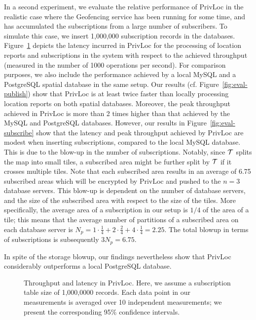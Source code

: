 \documentclass{llncs}
\newcommand\sol{{\sf PrivLoc}}
\begin{document}
In a second experiment, we evaluate the relative performance of \sol{} in the realistic case where
the Geofencing service has been running for some time, and has accumulated the subscriptions from a large number of subscribers. To simulate this case, we insert 1,000,000 subscription records in the databases.
Figure~\ref{fig:throughput} depicts the latency incurred in \sol{} for the processing of location reports and subscriptions in the system with respect to the
achieved throughput (measured in the number of 1000 operations
per second). For comparison purposes, we also include the performance achieved by a local MySQL and a PostgreSQL spatial database in the same setup.
Our results (cf. Figure~\ref{fig:eval-publish}) show that \sol{} is at least twice faster than locally processing location reports on both spatial databases. Moreover, the peak throughput achieved in \sol{} is more than 2 times higher than that
achieved by the MySQL and PostgreSQL databases. However, our results in Figure~\ref{fig:eval-subscribe} show that the latency and peak throughput achieved by \sol{} are modest when inserting subscriptions, compared to the local MySQL database.
This is due to the blow-up in the number of subscriptions. Notably, since $\cal T$ splits the map into small tiles, a subscribed area might
be further split by $\cal T$ if it crosses multiple tiles. Note that each subscribed area results in an average of 6.75 subscribed areas which will be encrypted
by \sol{} and pushed to the $n=3$ database servers. This blow-up is dependent on the number of database servers, and the size of the
subscribed area with respect to the size of the tiles. More specifically, the average area of a subscription in our setup is $1/4$ of the area of a tile; this means that the
average number of partitions of a subscribed area on each database server is $N_{p} = 1\cdot\frac{1}{4} + 2\cdot\frac{2}{4}  + 4\cdot\frac{1}{4}= 2.25$. The total blowup in terms of subscriptions is subsequently $3N_{p}= 6.75$.

In spite of the storage blowup, our findings nevertheless show that \sol{} considerably outperforms a local PostgreSQL database.


\begin{figure}[tbp]
\hfill
{}
\hfill
{}
\hfill
\caption{Throughput and latency in \sol. Here, we assume a subscription table size of 1,000,0000 records. Each data point in our measurements is averaged over 10 independent measurements; we present the corresponding 95\% confidence intervals.}
\label{fig:throughput}
\vspace{-1 em}
\end{figure}
\vspace{-1 em}
\end{document}
